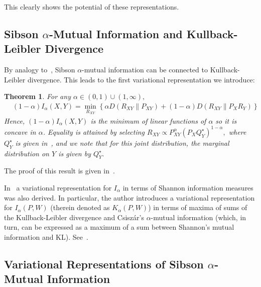 \documentclass{article}
\newtheorem{theorem}{Theorem}
\numberwithin{theorem}{section}
\numberwithin{example}{section}
\numberwithin{remark}{section}
\numberwithin{definition}{section}
\newcommand{\E}{\mathbb{E}}
\begin{document}
This clearly shows the potential of these representations.
\subsection{Sibson $\alpha$-Mutual Information and Kullback-Leibler Divergence}

By analogy to~, Sibson $\alpha$-mutual information can be connected to Kullback-Leibler divergence. This leads to the first variational representation we introduce:

\begin{theorem}\label{Lemma-SibsonViaKL}
For any $\alpha \in (0,1)\cup (1,\infty),$
\begin{align}
   &(1-\alpha)I_\alpha(X,Y)= \min_{R_{XY}} \left\{ \alpha D(R_{XY}\|P_{XY}) + (1-\alpha) D(R_{XY}\|P_{X}R_Y) \right\} \label{Lemma-SibsonViaKL-eq-main} %
\end{align}
Hence, $(1-\alpha)I_\alpha(X,Y)$ is the minimum of linear functions of $\alpha$ so it is concave in $\alpha$.
Equality is attained by selecting
$R_{XY} \propto P_{XY}^{\alpha} (P_XQ_Y^\star)^{1-\alpha},$
where $Q_Y^\star$ is given in~, and we note that for this joint distribution, the marginal distribution on $Y$ is given by $Q_Y^\star.$
\end{theorem}

The proof of this result is given in~.

In~\cite{shayevitz:2011} a variational representation for $I_\alpha$ in terms of Shannon information measures was also derived. In particular, the author introduces a variational representation for $I_\alpha(P,W)$ (therein denoted as $K_\alpha(P,W)$) in terms of maxima of sums of the Kullback-Leibler divergence and Csisz\'ar's $\alpha$-mutual information (which, in turn, can be expressed as a maximum of a sum between Shannon's mutual information and KL).
See~\cite[Theorem 1]{shayevitz:2011}.

\subsection{Variational Representations of Sibson $\alpha$-Mutual Information}
\end{document}

